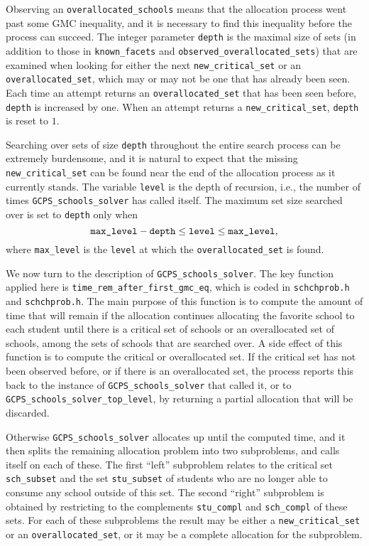 \documentclass[12pt]{article}
\theoremstyle{definition}
\begin{document}
\begin{appendix}
Observing an \texttt{overallocated\_schools} means that the allocation
process went past some GMC inequality, and it is necessary to find this
inequality before the process can succeed.  The integer parameter
\texttt{depth} is the maximal size of sets (in addition to those in
\texttt{known\_facets} and \texttt{observed\_overallocated\_sets})
that are examined when looking for either the next
\texttt{new\_critical\_set} or an \texttt{overallocated\_set}, which
may or may not be one that has already been seen.  Each time an
attempt returns an \texttt{overallocated\_set} that has been seen
before, \texttt{depth} is increased by one.  When an attempt returns a
\texttt{new\_critical\_set}, \texttt{depth} is reset to $1$.

Searching over sets of size \texttt{depth} throughout the entire
search process can be extremely burdensome, and it is natural to
expect that the missing \texttt{new\_critical\_set} can be found near
the end of the allocation process as it currently stands.  The
variable \texttt{level} is the depth of recursion, i.e., the number of
times \texttt{GCPS\_schools\_solver} has called itself. The maximum
set size searched over is set to \texttt{depth} only when
$$\text{\texttt{max\_level}} - \text{\texttt{depth}} \le
\text{\texttt{level}} \le \text{\texttt{max\_level}},$$ where
\texttt{max\_level} is the \texttt{level} at which the
\texttt{overallocated\_set} is found.

We now turn to the description of \texttt{GCPS\_schools\_solver}. The
key function applied here is
\texttt{time\_rem\_after\_first\_gmc\_eq}, which is
coded in \texttt{schchprob.h} and \texttt{schchprob.h}. The main
purpose of this function is to compute the amount of time that will
remain if the allocation continues allocating the favorite school to
each student until there is a critical set of schools or an
overallocated set of schools, among the sets of schools that are
searched over.  A side effect of this function is to compute the
critical or overallocated set.  If the critical set has not been
observed before, or if there is an overallocated set, the process
reports this back to the instance of \texttt{GCPS\_schools\_solver}
that called it, or to \texttt{GCPS\_schools\_solver\_top\_level}, by
returning a partial allocation that will be discarded.

Otherwise \texttt{GCPS\_schools\_solver} allocates up until the
computed time, and it then splits the remaining allocation problem
into two subproblems, and calls itself on each of these. The first
``left'' subproblem relates to the critical set \texttt{sch\_subset}
and the set \texttt{stu\_subset} of students who are no longer able to
consume any school outside of this set.  The second ``right''
subproblem is obtained by restricting to the complements
\texttt{stu\_compl} and \texttt{sch\_compl} of these sets.  For each
of these subproblems the result may be either a
\texttt{new\_critical\_set} or an \texttt{overallocated\_set}, or it
may be a complete allocation for the subproblem.


\end{appendix}
\end{document}
